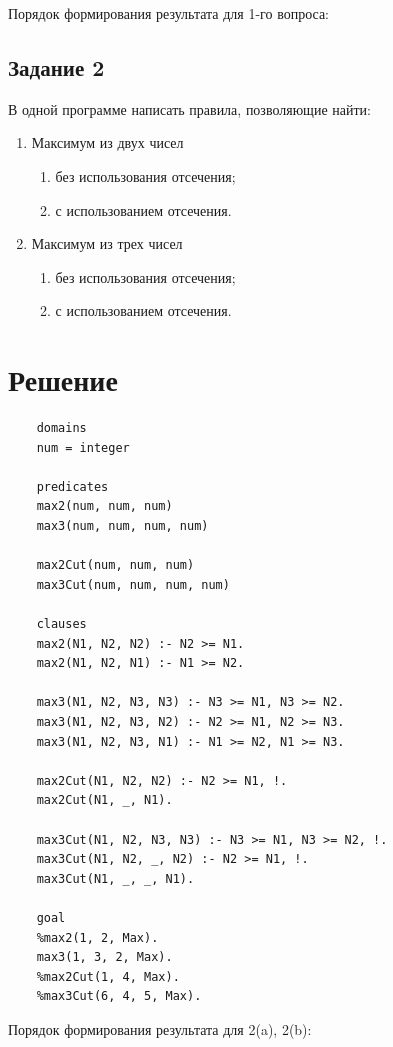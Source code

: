 \documentclass[12pt]{report}
\begin{document}
Порядок формирования результата для 1-го вопроса:



\section*{Задание 2}
В одной программе написать правила, позволяющие найти:
\begin{enumerate}
	\item Максимум из двух чисел
	\begin{enumerate}
		\item без использования отсечения;
		\item с использованием отсечения.
	\end{enumerate}
	\item Максимум из трех чисел
	\begin{enumerate}
		\item без использования отсечения;
		\item с использованием отсечения.
	\end{enumerate}
\end{enumerate}

\chapter*{Решение}
\begin{lstlisting}
	domains
	num = integer
	
	predicates
	max2(num, num, num)
	max3(num, num, num, num)
	
	max2Cut(num, num, num)
	max3Cut(num, num, num, num)
	
	clauses
	max2(N1, N2, N2) :- N2 >= N1.
	max2(N1, N2, N1) :- N1 >= N2.
	
	max3(N1, N2, N3, N3) :- N3 >= N1, N3 >= N2.
	max3(N1, N2, N3, N2) :- N2 >= N1, N2 >= N3.
	max3(N1, N2, N3, N1) :- N1 >= N2, N1 >= N3.
	
	max2Cut(N1, N2, N2) :- N2 >= N1, !.
	max2Cut(N1, _, N1).
	
	max3Cut(N1, N2, N3, N3) :- N3 >= N1, N3 >= N2, !.
	max3Cut(N1, N2, _, N2) :- N2 >= N1, !.
	max3Cut(N1, _, _, N1).
	
	goal
	%max2(1, 2, Max).
	max3(1, 3, 2, Max).
	%max2Cut(1, 4, Max).
	%max3Cut(6, 4, 5, Max).
\end{lstlisting}

Порядок формирования результата для 2(a), 2(b):


\end{document}
